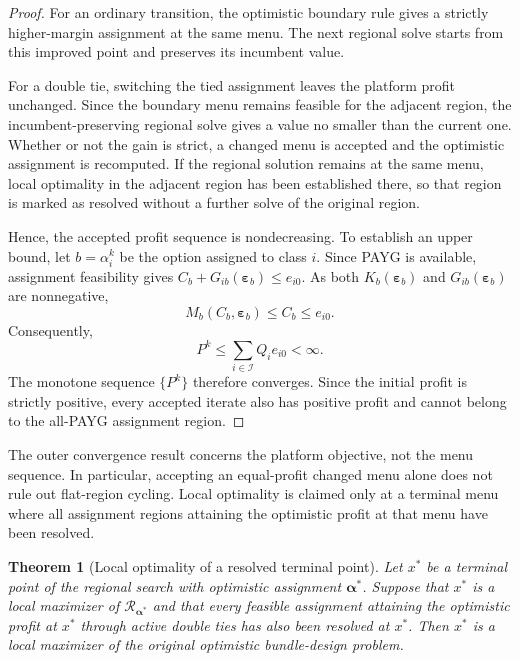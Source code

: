 \documentclass{article}
\newtheorem{theorem}{Theorem}
\begin{document}
\begin{proof}
For an ordinary transition, the optimistic boundary rule gives a
strictly higher-margin assignment at the same menu. The next regional
solve starts from this improved point and preserves its incumbent value.

For a double tie, switching the tied assignment leaves the platform
profit unchanged. Since the boundary menu remains feasible for the
adjacent region, the incumbent-preserving regional solve gives a value
no smaller than the current one. Whether or not the gain is strict, a
changed menu is accepted and the optimistic assignment is recomputed.
If the regional solution remains at the same menu, local optimality in
the adjacent region has been established there, so that region is marked
as resolved without a further solve of the original region.

Hence, the accepted profit sequence is nondecreasing. To establish an
upper bound, let $b=\alpha_i^k$ be the option assigned to class $i$.
Since PAYG is available, assignment feasibility gives
$C_b+G_{ib}(\bm\varepsilon_b)\leq e_{i0}$. As both
$K_b(\bm\varepsilon_b)$ and $G_{ib}(\bm\varepsilon_b)$ are nonnegative,
\begin{equation}
    M_b(C_b,\bm\varepsilon_b)
    \leq C_b \leq e_{i0}.
\end{equation}
Consequently,
\begin{equation}
    P^k\leq\sum_{i\in\mathcal I}Q_i e_{i0}<\infty.
    \label{eq:payg-profit-upper-bound}
\end{equation}
The monotone sequence $\{P^k\}$ therefore converges. Since the initial
profit is strictly positive, every accepted iterate also has positive
profit and cannot belong to the all-PAYG assignment region.
\end{proof}

The outer convergence result concerns the platform objective, not the
menu sequence. In particular, accepting an equal-profit changed menu
alone does not rule out flat-region cycling. Local optimality is claimed
only at a terminal menu where all assignment regions attaining the
optimistic profit at that menu have been resolved.

\begin{theorem}[Local optimality of a resolved terminal point]
Let $x^*$ be a terminal point of the regional search with optimistic
assignment $\bm\alpha^*$. Suppose that $x^*$ is a local maximizer of
$\mathcal R_{\bm\alpha^*}$ and that every feasible assignment attaining
the optimistic profit at $x^*$ through active double ties has also been
resolved at $x^*$. Then $x^*$ is a local maximizer of the original
optimistic bundle-design problem.
\label{thm:local-optimality}
\end{theorem}
\end{document}
